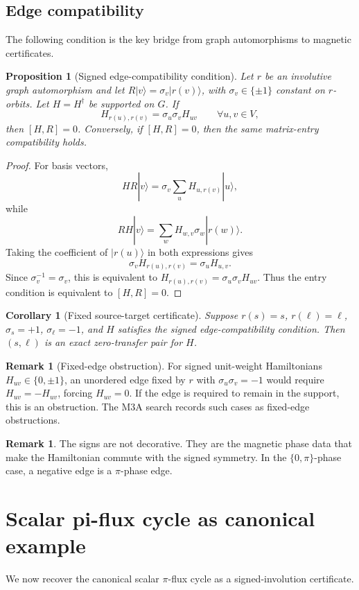 \documentclass[11pt]{article}
\newtheorem{proposition}[theorem]{Proposition}
\newtheorem{corollary}[theorem]{Corollary}
\theoremstyle{definition}
\newtheorem{remark}[theorem]{Remark}
\begin{document}
\subsection{Edge compatibility}
The following condition is the key bridge from graph automorphisms to magnetic certificates.

\begin{proposition}[Signed edge-compatibility condition]
Let $r$ be an involutive graph automorphism and let $R|v\rangle=\sigma_v|r(v)\rangle$, with $\sigma_v\in\{\pm1\}$ constant on $r$-orbits. Let $H=H^\dagger$ be supported on $G$. If
\[
H_{r(u),r(v)}=\sigma_u\sigma_vH_{uv}\qquad \forall u,v\in V,
\]
then $[H,R]=0$. Conversely, if $[H,R]=0$, then the same matrix-entry compatibility holds.
\end{proposition}

\begin{proof}
For basis vectors,
\[
HR|v\rangle=\sigma_v\sum_u H_{u,r(v)}|u\rangle,
\]
while
\[
RH|v\rangle=\sum_w H_{w,v}\sigma_w|r(w)\rangle.
\]
Taking the coefficient of $|r(u)\rangle$ in both expressions gives
\[
\sigma_vH_{r(u),r(v)}=\sigma_uH_{u,v}.
\]
Since $\sigma_v^{-1}=\sigma_v$, this is equivalent to $H_{r(u),r(v)}=\sigma_u\sigma_vH_{uv}$. Thus the entry condition is equivalent to $[H,R]=0$.
\end{proof}

\begin{corollary}[Fixed source-target certificate]
Suppose $r(s)=s$, $r(\ell)=\ell$, $\sigma_s=+1$, $\sigma_\ell=-1$, and $H$ satisfies the signed edge-compatibility condition. Then $(s,\ell)$ is an exact zero-transfer pair for $H$.
\end{corollary}

\begin{remark}[Fixed-edge obstruction]
For signed unit-weight Hamiltonians $H_{uv}\in\{0,\pm1\}$, an unordered edge fixed by $r$ with $\sigma_u\sigma_v=-1$ would require $H_{uv}=-H_{uv}$, forcing $H_{uv}=0$. If the edge is required to remain in the support, this is an obstruction. The M3A search records such cases as fixed-edge obstructions.
\end{remark}

\begin{remark}
The signs are not decorative. They are the magnetic phase data that make the Hamiltonian commute with the signed symmetry. In the $\{0,\pi\}$-phase case, a negative edge is a $\pi$-phase edge.
\end{remark}

\section{Scalar pi-flux cycle as canonical example}
We now recover the canonical scalar $\pi$-flux cycle as a signed-involution certificate.
\end{document}
